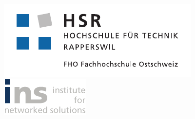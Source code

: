 \begin{titlepage}
\begin{flushleft}

\begin{figure}[tbp]
  \begin{minipage}[c]{0.4\textwidth}
    \includegraphics[width=\textwidth]{../document_files/images/hsr_logo.pdf}
  \end{minipage}
  \hfill
  \begin{minipage}[c]{0.3\textwidth}
    \includegraphics[width=\textwidth]{../document_files/images/ins_logo.png}
  \end{minipage}
\end{figure}



\noindent\begin{minipage}[t]{0.49\textwidth}
  \begin{flushleft}
    \vspace{0pt}
  \end{flushleft}
\end{minipage}
\hfill
\begin{minipage}[t]{0.49\textwidth}
  \begin{flushright}
    \vspace{0pt}
  \end{flushright}
\end{minipage}
\\[4cm]


\end{flushleft}
\end{titlepage}
